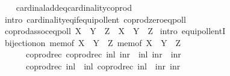 \begin{isabellebody}
%
\isadelimproof
\ \ %
\endisadelimproof
%
\isatagproof
{}\isamarkupfalse%
\ cardinal{\isacharunderscore}{\kern0pt}add{\isacharunderscore}{\kern0pt}eq{\isacharunderscore}{\kern0pt}cardinality{\isacharunderscore}{\kern0pt}coprod\isanewline
\ \ \isamarkupfalse%
\ {\isacharparenleft}{\kern0pt}intro\ cardinality{\isacharunderscore}{\kern0pt}eq{\isacharunderscore}{\kern0pt}if{\isacharunderscore}{\kern0pt}equipollent\ coprod{\isacharunderscore}{\kern0pt}zero{\isacharunderscore}{\kern0pt}eqpoll{\isacharparenright}{\kern0pt}%
\endisatagproof
{\isafoldproof}%
%
\isadelimproof
\isanewline
%
\endisadelimproof
\isanewline
{}\isamarkupfalse%
\ coprod{\isacharunderscore}{\kern0pt}assoc{\isacharunderscore}{\kern0pt}eqpoll{\isacharcolon}{\kern0pt}\ {\isachardoublequoteopen}{\isacharparenleft}{\kern0pt}X\ {\isasymCoprod}\ Y{\isacharparenright}{\kern0pt}\ {\isasymCoprod}\ Z\ {\isasymapprox}\ X\ {\isasymCoprod}\ {\isacharparenleft}{\kern0pt}Y\ {\isasymCoprod}\ Z{\isacharparenright}{\kern0pt}{\isachardoublequoteclose}\isanewline
%
\isadelimproof
%
\endisadelimproof
%
\isatagproof
{}\isamarkupfalse%
\ {\isacharparenleft}{\kern0pt}intro\ equipollentI{\isacharparenright}{\kern0pt}\isanewline
\ \ \ \isamarkupfalse%
\ {\isachardoublequoteopen}bijection{\isacharunderscore}{\kern0pt}on\ {\isacharparenleft}{\kern0pt}mem{\isacharunderscore}{\kern0pt}of\ {\isacharparenleft}{\kern0pt}{\isacharparenleft}{\kern0pt}X\ {\isasymCoprod}\ Y{\isacharparenright}{\kern0pt}\ {\isasymCoprod}\ Z{\isacharparenright}{\kern0pt}{\isacharparenright}{\kern0pt}\ {\isacharparenleft}{\kern0pt}mem{\isacharunderscore}{\kern0pt}of\ {\isacharparenleft}{\kern0pt}X\ {\isasymCoprod}\ {\isacharparenleft}{\kern0pt}Y\ {\isasymCoprod}\ Z{\isacharparenright}{\kern0pt}{\isacharparenright}{\kern0pt}{\isacharparenright}{\kern0pt}\isanewline
\ \ \ \ \ \ {\isacharparenleft}{\kern0pt}coprod{\isacharunderscore}{\kern0pt}rec\ {\isacharparenleft}{\kern0pt}coprod{\isacharunderscore}{\kern0pt}rec\ inl\ {\isacharparenleft}{\kern0pt}inr\ {\isasymcirc}\ inl{\isacharparenright}{\kern0pt}{\isacharparenright}{\kern0pt}\ {\isacharparenleft}{\kern0pt}inr\ {\isasymcirc}\ inr{\isacharparenright}{\kern0pt}{\isacharparenright}{\kern0pt}\isanewline
\ \ \ \ \ \ {\isacharparenleft}{\kern0pt}coprod{\isacharunderscore}{\kern0pt}rec\ {\isacharparenleft}{\kern0pt}inl\ {\isasymcirc}\ inl{\isacharparenright}{\kern0pt}\ {\isacharparenleft}{\kern0pt}coprod{\isacharunderscore}{\kern0pt}rec\ {\isacharparenleft}{\kern0pt}inl\ {\isasymcirc}\ inr{\isacharparenright}{\kern0pt}\ inr{\isacharparenright}{\kern0pt}{\isacharparenright}{\kern0pt}{\isachardoublequoteclose}\isanewline

\end{isabellebody}
